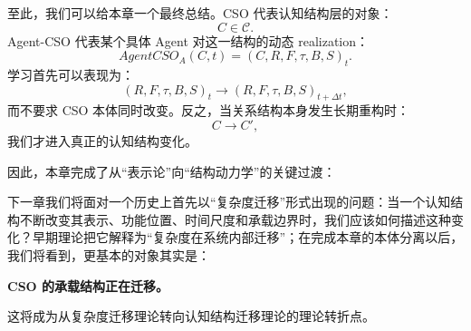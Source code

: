 至此，我们可以给本章一个最终总结。CSO 代表认知结构层的对象：
\[
C\in\mathcal C.
\]
Agent-CSO 代表某个具体 Agent 对这一结构的动态 realization：
\[
AgentCSO_A(C,t)
=
(C,R,F,\tau,B,S)_t.
\]
学习首先可以表现为：
\[
(R,F,\tau,B,S)_t
\rightarrow
(R,F,\tau,B,S)_{t+\Delta t},
\]
而不要求 CSO 本体同时改变。反之，当关系结构本身发生长期重构时：
\[
C
\rightarrow
C',
\]
我们才进入真正的认知结构变化。

因此，本章完成了从“表示论”向“结构动力学”的关键过渡：
\begin{statementbox}
\centering
{}
\end{statementbox}

下一章我们将面对一个历史上首先以“复杂度迁移”形式出现的问题：当一个认知结构不断改变其表示、功能位置、时间尺度和承载边界时，我们应该如何描述这种变化？早期理论把它解释为“复杂度在系统内部迁移”；在完成本章的本体分离以后，我们将看到，更基本的对象其实是：
\begin{statementbox}
\centering\bfseries
CSO 的承载结构正在迁移。
\end{statementbox}
这将成为从复杂度迁移理论转向认知结构迁移理论的理论转折点。
